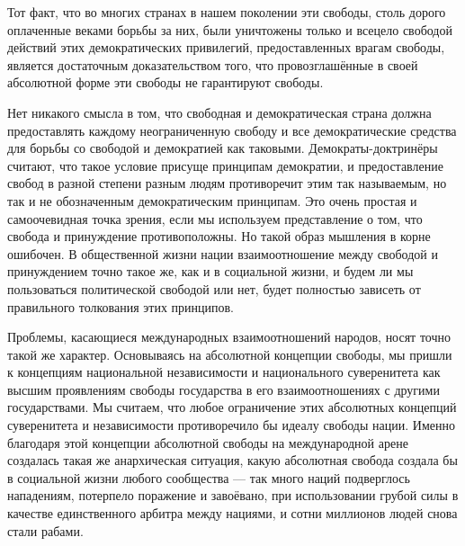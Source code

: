 Тот факт, что во многих странах в нашем поколении эти свободы, столь дорого оплаченные веками борьбы за них, были уничтожены только и всецело свободой действий этих демократических привилегий, предоставленных врагам свободы, является достаточным доказательством того, что провозглашённые в своей абсолютной форме эти свободы не гарантируют свободы.

Нет никакого смысла в том, что свободная и демократическая страна должна предоставлять каждому неограниченную свободу и все демократические средства для борьбы со свободой и демократией как таковыми. Демократы-доктринёры считают, что такое условие присуще принципам демократии, и предоставление свобод в разной степени разным людям противоречит этим так называемым, но так и не обозначенным демократическим принципам. Это очень простая и самоочевидная точка зрения, если мы используем представление о том, что свобода и принуждение противоположны. Но такой образ мышления в корне ошибочен. В общественной жизни нации взаимоотношение между свободой и принуждением точно такое же, как и в социальной жизни, и будем ли мы пользоваться политической свободой или нет, будет полностью зависеть от правильного толкования этих принципов.
 
Проблемы, касающиеся международных взаимоотношений народов, носят точно такой же характер. Основываясь на абсолютной концепции свободы, мы пришли к концепциям национальной независимости и национального суверенитета как высшим проявлениям свободы государства в его взаимоотношениях с другими государствами. Мы считаем, что любое ограничение этих абсолютных концепций суверенитета и независимости противоречило бы идеалу свободы нации. Именно благодаря этой концепции абсолютной свободы на международной арене создалась такая же анархическая ситуация, какую абсолютная свобода создала бы в социальной жизни любого сообщества — так много наций подверглось нападениям, потерпело поражение и завоёвано, при использовании грубой силы в качестве единственного арбитра между нациями, и сотни миллионов людей снова стали рабами.
